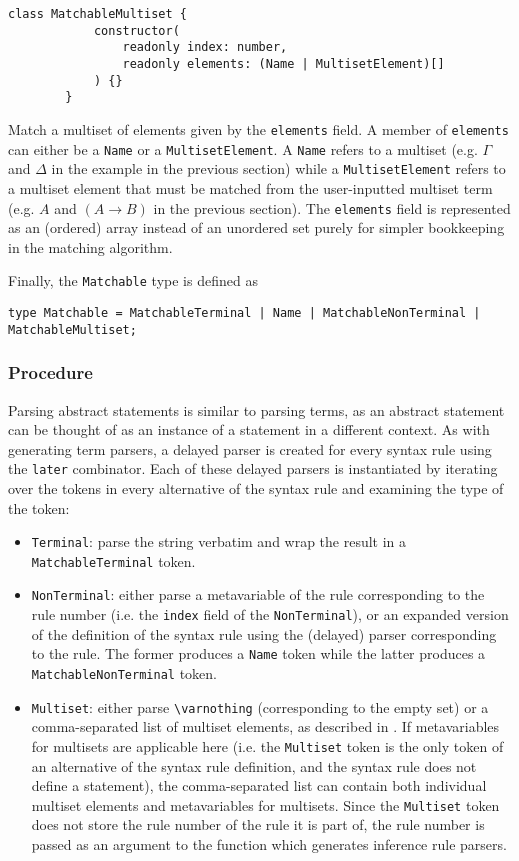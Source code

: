 \begin{itemize}
\begin{lstlisting}[style=ds]
        class MatchableMultiset {
            constructor(
                readonly index: number,
                readonly elements: (Name | MultisetElement)[]
            ) {}
        }
    \end{lstlisting}
    Match a multiset of elements given by the \lstinline{elements} field. A member of \lstinline{elements} can either be a \lstinline{Name} or a \lstinline{MultisetElement}. A \lstinline{Name} refers to a multiset (e.g. $\Gamma$ and $\Delta$ in the example in the previous section) while a \lstinline{MultisetElement} refers to a multiset element that must be matched from the user-inputted multiset term (e.g. $A$ and $(A \to B)$ in the previous section). The \lstinline{elements} field is represented as an (ordered) array instead of an unordered set purely for simpler bookkeeping in the matching algorithm.
\end{itemize}
Finally, the \lstinline{Matchable} type is defined as
\begin{center}
    \lstinline{type Matchable = MatchableTerminal | Name | MatchableNonTerminal | MatchableMultiset;}
\end{center}
\subsubsection{Procedure}
Parsing abstract statements is similar to parsing terms, as an abstract statement can be thought of as an instance of a statement in a different context. As with generating term parsers, a delayed parser is created  for every syntax rule using the \lstinline{later} combinator. Each of these delayed parsers is instantiated by iterating over the tokens in every alternative of the syntax rule and examining the type of the token:
\begin{itemize}
    \item \lstinline{Terminal}: parse the string verbatim and wrap the result in a \lstinline{MatchableTerminal} token.
    \item \lstinline{NonTerminal}: either parse a metavariable of the rule corresponding to the rule number (i.e. the \lstinline{index} field of the \lstinline{NonTerminal}), or an expanded version of the definition of the syntax rule using the (delayed) parser corresponding to the rule. The former produces a \lstinline{Name} token while the latter produces a \lstinline{MatchableNonTerminal} token.
    \item \lstinline{Multiset}: either parse \lstinline{\varnothing} (corresponding to the empty set) or a comma-separated list of multiset elements, as described in . If metavariables for multisets are applicable here (i.e. the \lstinline{Multiset} token is the only token of an alternative of the syntax rule definition, and the syntax rule does not define a statement), the comma-separated list can contain both individual multiset elements and metavariables for multisets. Since the \lstinline{Multiset} token does not store the rule number of the rule it is part of, the rule number is passed as an argument to the function which generates inference rule parsers.
\end{itemize}